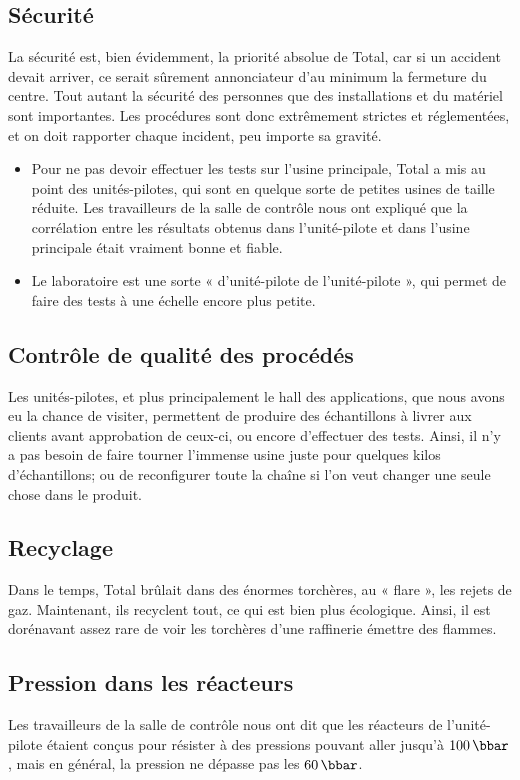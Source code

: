 \subsection{Sécurité}
La sécurité est, bien évidemment, la priorité absolue de Total, car si un accident devait arriver, ce serait sûrement annonciateur d'au minimum la fermeture du centre. Tout autant la sécurité des personnes que des installations et du matériel sont importantes. Les procédures sont donc extrêmement strictes et réglementées, et on doit rapporter chaque incident, peu importe sa gravité.
\begin{itemize}
\item Pour ne pas devoir effectuer les tests sur l'usine principale, Total a mis au point des unités-pilotes, qui sont en quelque sorte de petites usines de taille réduite.  Les travailleurs de la salle de contrôle nous ont expliqué que la corrélation entre les résultats obtenus dans l'unité-pilote et dans l'usine principale était vraiment bonne et fiable.
\item Le laboratoire est une sorte « d'unité-pilote de l'unité-pilote », qui permet de faire des tests à une échelle encore plus petite.
\end{itemize}

\subsection{Contrôle de qualité des procédés}
Les unités-pilotes, et plus principalement le hall des applications, que nous avons eu la chance de visiter, permettent de produire des échantillons à livrer aux clients avant approbation de ceux-ci, ou encore d'effectuer des tests. Ainsi, il n'y a pas besoin de faire tourner l'immense usine juste pour quelques kilos d'échantillons; ou de reconfigurer toute la chaîne si l'on veut changer une seule chose dans le produit.

\subsection{Recyclage}
Dans le temps, Total brûlait dans des énormes torchères, au « flare », les rejets de gaz. Maintenant, ils recyclent tout, ce qui est bien plus écologique. Ainsi, il est dorénavant assez rare de voir les torchères d'une raffinerie émettre des flammes.

\subsection{Pression dans les réacteurs}
Les travailleurs de la salle de contrôle nous ont dit que les réacteurs de l'unité-pilote étaient conçus pour résister à des pressions pouvant aller jusqu'à $100\,\bbar$, mais en général, la pression ne dépasse pas les $60\,\bbar$.

